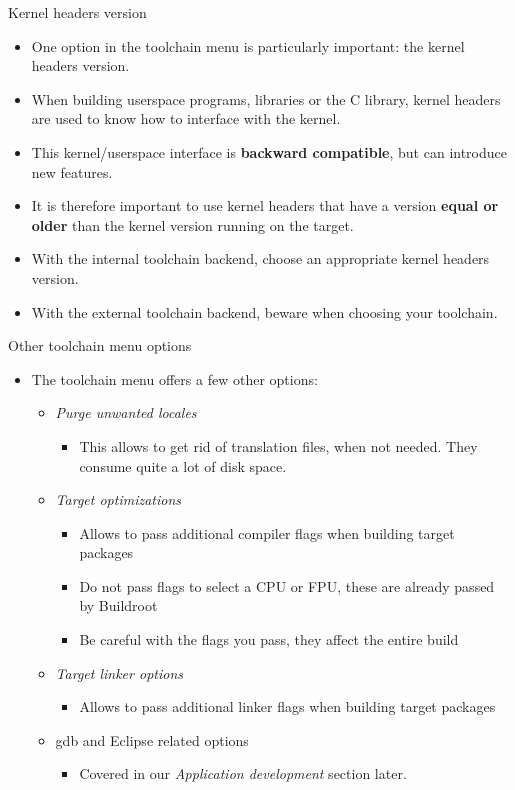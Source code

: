 \begin{frame}{Kernel headers version}
  \begin{itemize}
  \item One option in the toolchain menu is particularly important:
    the kernel headers version.
  \item When building userspace programs, libraries or the C library,
    kernel headers are used to know how to interface with the kernel.
  \item This kernel/userspace interface is {\bf backward compatible},
    but can introduce new features.
  \item It is therefore important to use kernel headers that have a
    version {\bf equal or older} than the kernel version running on
    the target.
  \item With the internal toolchain backend, choose an appropriate
    kernel headers version.
  \item With the external toolchain backend, beware when choosing your
    toolchain.
  \end{itemize}
\end{frame}

\begin{frame}{Other toolchain menu options}
  \begin{itemize}
  \item The toolchain menu offers a few other options:
    \begin{itemize}
    \item {\em Purge unwanted locales}
      \begin{itemize}
      \item This allows to get rid of translation files, when not
        needed. They consume quite a lot of disk space.
      \end{itemize}
    \item {\em Target optimizations}
      \begin{itemize}
      \item Allows to pass additional compiler flags when building
        target packages
      \item Do not pass flags to select a CPU or FPU, these are
        already passed by Buildroot
      \item Be careful with the flags you pass, they affect the entire
        build
      \end{itemize}
    \item {\em Target linker options}
      \begin{itemize}
      \item Allows to pass additional linker flags when building
        target packages
      \end{itemize}
    \item gdb and Eclipse related options
      \begin{itemize}
      \item Covered in our {\em Application development} section later.
      \end{itemize}
    \end{itemize}
  \end{itemize}
\end{frame}
